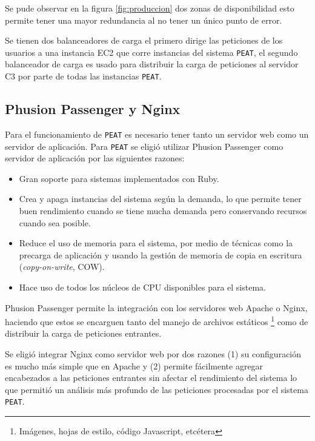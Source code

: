 Se pude observar en la figura \ref{fig:produccion} dos zonas de disponibilidad
esto permite tener una mayor redundancia al no tener un único punto de error.

Se tienen dos balanceadores de carga el primero dirige las peticiones de los
usuarios a una instancia EC2 que corre instancias del sistema \texttt{PEAT},
el segundo balanceador de carga es usado para distribuir la carga de peticiones
al servidor C3 por parte de todas las instancias \texttt{PEAT}.

\subsection{Phusion Passenger y Nginx}

Para el funcionamiento de \texttt{PEAT} es necesario tener tanto un servidor web
como un servidor de aplicación.
Para \texttt{PEAT} se eligió utilizar Phusion Passenger como servidor de aplicación
por las siguientes razones:

\begin{itemize}
\item Gran soporte para sistemas implementados con Ruby.
\item Crea y apaga instancias del sistema según la demanda, lo que permite tener
  buen rendimiento cuando se tiene mucha demanda pero conservando recursos cuando
  sea posible.
\item Reduce el uso de memoria para el sistema, por medio de técnicas como
  la precarga de aplicación y usando la gestión de memoria de copia en escritura
  (\textit{copy-on-write}, COW).
\item Hace uso de todos los núcleos de CPU disponibles para el sistema.
\end{itemize}

Phusion Passenger permite la integración con los servidores web Apache o Nginx,
haciendo que estos se encarguen tanto del manejo de archivos estáticos
\footnote{Imágenes, hojas de estilo, código Javascript, etcétera} como de distribuir
la carga de peticiones entrantes.

Se eligió integrar Nginx como servidor web por dos razones (1) su configuración es
mucho más simple que en Apache y (2) permite fácilmente agregar encabezados a las
peticiones entrantes sin afectar el rendimiento del sistema lo que permitió un
análisis más profundo de las peticiones procesadas por el sistema \texttt{PEAT}.

